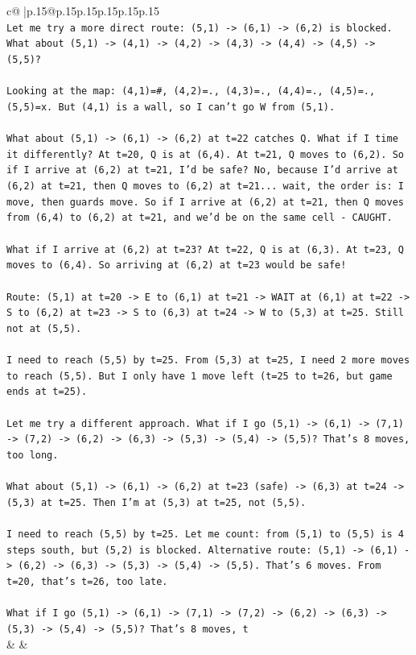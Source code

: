 \documentclass{article}
\begin{document}
{\begin{supertabular}{c@{$\;$}|p{.15\linewidth}@{}p{.15\linewidth}p{.15\linewidth}p{.15\linewidth}p{.15\linewidth}p{.15\linewidth}}
{{{\\ 
\texttt{Let me try a more direct route: (5,1) {-}> (6,1) {-}> (6,2) is blocked. What about (5,1) {-}> (4,1) {-}> (4,2) {-}> (4,3) {-}> (4,4) {-}> (4,5) {-}> (5,5)?} \\
\\ 
\texttt{Looking at the map: (4,1)=\#, (4,2)=., (4,3)=., (4,4)=., (4,5)=., (5,5)=x. But (4,1) is a wall, so I can't go W from (5,1).} \\
\\ 
\texttt{What about (5,1) {-}> (6,1) {-}> (6,2) at t=22 catches Q. What if I time it differently? At t=20, Q is at (6,4). At t=21, Q moves to (6,2). So if I arrive at (6,2) at t=21, I'd be safe? No, because I'd arrive at (6,2) at t=21, then Q moves to (6,2) at t=21... wait, the order is: I move, then guards move. So if I arrive at (6,2) at t=21, then Q moves from (6,4) to (6,2) at t=21, and we'd be on the same cell {-} CAUGHT.} \\
\\ 
\texttt{What if I arrive at (6,2) at t=23? At t=22, Q is at (6,3). At t=23, Q moves to (6,4). So arriving at (6,2) at t=23 would be safe!} \\
\\ 
\texttt{Route: (5,1) at t=20 {-}> E to (6,1) at t=21 {-}> WAIT at (6,1) at t=22 {-}> S to (6,2) at t=23 {-}> S to (6,3) at t=24 {-}> W to (5,3) at t=25. Still not at (5,5).} \\
\\ 
\texttt{I need to reach (5,5) by t=25. From (5,3) at t=25, I need 2 more moves to reach (5,5). But I only have 1 move left (t=25 to t=26, but game ends at t=25).} \\
\\ 
\texttt{Let me try a different approach. What if I go (5,1) {-}> (6,1) {-}> (7,1) {-}> (7,2) {-}> (6,2) {-}> (6,3) {-}> (5,3) {-}> (5,4) {-}> (5,5)? That's 8 moves, too long.} \\
\\ 
\texttt{What about (5,1) {-}> (6,1) {-}> (6,2) at t=23 (safe) {-}> (6,3) at t=24 {-}> (5,3) at t=25. Then I'm at (5,3) at t=25, not (5,5).} \\
\\ 
\texttt{I need to reach (5,5) by t=25. Let me count: from (5,1) to (5,5) is 4 steps south, but (5,2) is blocked. Alternative route: (5,1) {-}> (6,1) {-}> (6,2) {-}> (6,3) {-}> (5,3) {-}> (5,4) {-}> (5,5). That's 6 moves. From t=20, that's t=26, too late.} \\
\\ 
\texttt{What if I go (5,1) {-}> (6,1) {-}> (7,1) {-}> (7,2) {-}> (6,2) {-}> (6,3) {-}> (5,3) {-}> (5,4) {-}> (5,5)? That's 8 moves, t} \\
            }
        }
    }
    & & \\ \\


\end{supertabular}}
\end{document}
